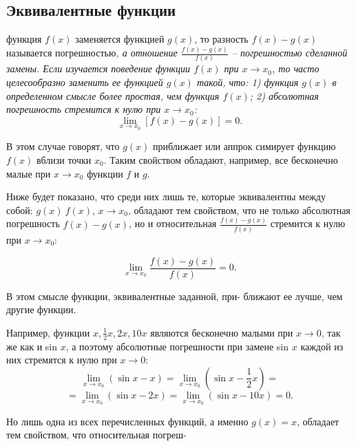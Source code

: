 \documentclass[a4paper,12pt,cmcyralt]{article}
\begin{document}
\setcounter{section}{8}
\setcounter{subsection}{2}
\noindent\subsection{\textsf{Эквивалентные функции}}


 функция $f(x)$ заменяется функцией $g(x)$, то разность $f(x) - g(x)$ называется  погрешностью\em, а отношение $\frac{f(x) - g(x)}{f(x)}$ --  погрешностью \em сделанной замены. Если изучается поведение функции $f(x)$ при $x \rightarrow x_0$, то часто целесообразно заменить ее функцией $g(x)$ такой, что: 1) функция $g(x)$ в определенном смысле более простая, чем функция $f(x)$; 2) абсолютная погрешность стремится к нулю при $x \rightarrow x_0$:
$$ \lim\limits_{x\to x_0} [f(x) - g(x)] =0 .$$

В этом случае говорят, что $g(x)$ приближает или аппрок симирует функцию $f(x)$ вблизи точки $x_0$. Таким свойством обладают, например, все бесконечно малые при $x\to x_0$ функции $f$ и $g$.

Ниже будет показано, что среди них лишь те, которые эквивалентны между собой: $g(x)~f(x)$, $x\to x_0$, обладают тем свойством, что не только абсолютная погрешность $f(x) - g(x)$, но и относительная $\frac{f(x) - g(x)}{f(x)}$ стремится к нулю при $x\to x_0$:

$$ \lim\limits_{x\to x_0} \frac{f(x) - g(x)}{f(x)} =0 .$$

В этом смысле функции, эквивалентные заданной, при- ближают ее лучше, чем другие функции.

Например, функции $x, \frac{1}{2}x, 2x, 10x$ являются бесконечно малыми при $ x \to 0$, так же как и sin $x$, а поэтому абсолютные погрешности при замене sin $x$ каждой из них стремятся к нулю при $ x \to 0$:
\[ \lim\limits_{x\to x_0} (\sin x - x) = \lim\limits_{x\to x_0} (\sin x -  \frac{1}{2} x) =\] 
\[ =\lim\limits_{x\to x_0} (\sin x - 2x) = \lim\limits_{x\to x_0} (\sin x - 10x) = 0.\]

Но лишь одна из всех перечисленных функций, а именно $g(x) = x$, обладает тем свойством, что относительная погреш-
\end{document}
